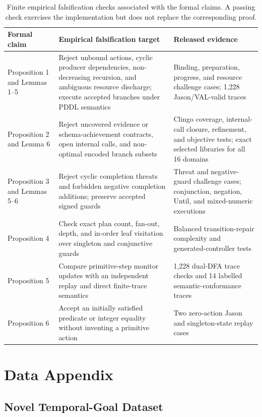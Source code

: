 \begin{table}[htbp]
\centering
\small
\setlength{\tabcolsep}{4pt}
\begin{tabular}{p{}p{}p{}}
\toprule
Formal claim & Empirical falsification target & Released evidence \\
\midrule
Proposition 1 and Lemmas 1--5 &
Reject unbound actions, cyclic producer dependencies, non-decreasing
recursion, and ambiguous resource discharge; execute accepted branches under
PDDL semantics &
Binding, preparation, progress, and resource challenge cases; 1,228
Jason/VAL-valid traces \\
Proposition 2 and Lemma 6 &
Reject uncovered evidence or schema-achievement contracts, open internal calls,
and non-optimal encoded branch subsets &
Clingo coverage, internal-call closure, refinement, and objective tests; exact selected
libraries for all 16 domains \\
Proposition 3 and Lemmas 5--6 &
Reject cyclic completion threats and forbidden negative completion additions;
preserve accepted signed guards &
Threat and negative-guard challenge cases; conjunction, negation, Until, and
mixed-numeric executions \\
Proposition 4 &
Check exact plan count, fan-out, depth, and in-order leaf visitation over
singleton and conjunctive guards &
Balanced transition-repair complexity and generated-controller tests \\
Proposition 5 &
Compare primitive-step monitor updates with an independent replay and direct
finite-trace semantics &
1,228 dual-DFA trace checks and 14 labelled semantic-conformance traces \\
Proposition 6 &
Accept an initially satisfied predicate or integer equality without inventing
a primitive action &
Two zero-action Jason and singleton-state replay cases \\
\bottomrule
\end{tabular}
\caption{Finite empirical falsification checks associated with the formal
claims. A passing check exercises the implementation but does not replace the
corresponding proof.}
\label{tab:claim-checks}
\end{table}

\section{Data Appendix}
\label{app:data}

\subsection{Novel Temporal-Goal Dataset}
\label{app:teg-dataset}

